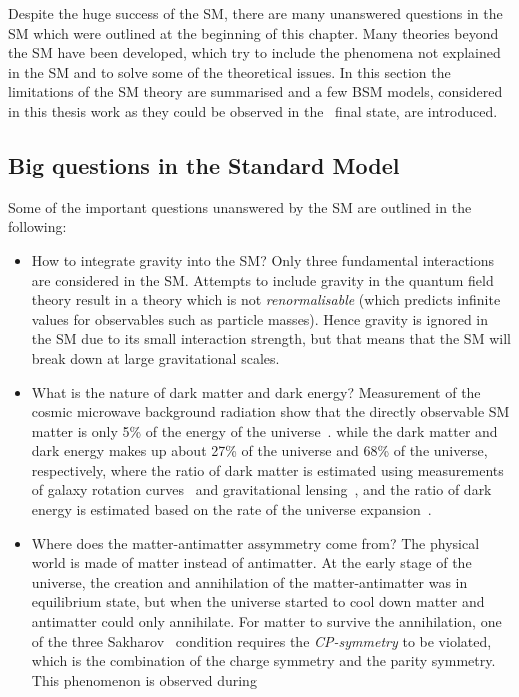 \label{sec:BSM}
Despite the huge success of the SM, there are many unanswered
questions in the SM which were outlined at the beginning of this chapter. 
Many theories beyond the SM have been developed, which try to include 
the phenomena not explained in the SM and to solve some of the theoretical issues. 
In this section the limitations of the SM theory are summarised and a few BSM
models, considered in this thesis work as they could be observed 
in the \bbtautau\ final state, are introduced.

\subsection{Big questions in the Standard Model}
Some of the important questions unanswered by the SM are outlined in the following:
\begin{itemize}
    \item How to integrate gravity into the SM? 
   Only three fundamental interactions are considered 
in the SM. Attempts to include gravity in the quantum field theory result in 
a theory which is not \textit{renormalisable} (which predicts infinite values for 
observables such as particle masses). Hence gravity is ignored in the SM 
due to its small interaction strength, but that means that the SM will break down 
at large gravitational scales.
    \item What is the nature of dark matter and dark energy?  
Measurement of the cosmic microwave background radiation 
show that the directly observable SM matter is only 5\% of the energy of the universe~\cite{cmb}.
while the dark matter and dark energy makes up about 27\% of the universe and 68\% of the universe,
respectively, where the ratio of dark matter is estimated using measurements 
of galaxy rotation curves~\cite{darkmatter-galaxy} and gravitational lensing~\cite{darkmatter-lense},
and the ratio of dark energy is estimated based on the rate of the universe expansion~\cite{darkenergy}. 
    \item Where does the matter-antimatter assymmetry come from? 
The physical world is made of matter instead of antimatter. 
At the early stage of the universe, the creation and annihilation of the matter-antimatter
was in equilibrium state, but when the universe started to cool down matter and antimatter could only 
annihilate. For matter to survive the annihilation, 
one of the three Sakharov~\cite{Sakharov} condition requires the
\textit{CP-symmetry} to be violated, 
which is the combination of the charge symmetry and the parity symmetry. This phenomenon is observed during 

\end{itemize}
